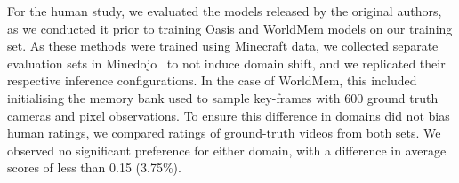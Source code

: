 \begin{subappendices}

For the human study, we evaluated the models released by the original authors, as we conducted it prior to training Oasis and WorldMem models on our training set. As these methods were trained using Minecraft data, we collected separate evaluation sets in Minedojo~\citep{fan2022minedojo} to not induce domain shift, and we replicated their respective inference configurations. In the case of WorldMem, this included initialising the memory bank used to sample key-frames with 600 ground truth cameras and pixel observations. To ensure this difference in domains did not bias human ratings, we compared ratings of ground-truth videos from both sets. We observed no significant preference for either domain, with a difference in average scores of less than 0.15 (3.75\%).


\end{subappendices}
